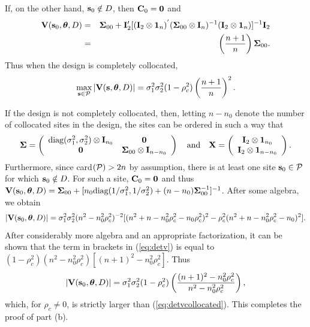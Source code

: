 \documentclass[12pt]{article}
\def\btheta{\mbox{\boldmath$\theta$}}
\def\bSigma{\mbox{\boldmath$\Sigma$}}
\begin{document}
If, on the other hand, ${\bf s}_0\notin D$, then ${\bf C}_0={\bf 0}$ and
\begin{eqnarray*}
{\bf V}({\bf s}_0,\btheta,D) & = & \bSigma_{00}+{\bf I}_2^{\prime}[({\bf I}_2\otimes{\bf 1}_n)^{'}(\bSigma_{00}\otimes{\bf I}_n)^{-1}({\bf I}_2\otimes {\bf 1}_n)]^{-1}{\bf I}_2 \\
& = & \left(\frac{n+1}{n}\right)\bSigma_{00}.
\end{eqnarray*}
Thus when the design is completely collocated,
\begin{equation}\label{eq:detvcollocated}
\max_{{\bf s}\in{\cal P}}|{\bf V}({\bf s},\btheta,D)|=\sigma_1^2\sigma_2^2(1-\rho_c^2)\left(\frac{n+1}{n}\right)^2.
\end{equation}

If the design is not completely collocated, then, letting $n-n_0$ denote the number of collocated sites in the design, the sites can be ordered in such a way that
\[ \bSigma=\left(\begin{array}{cc}
\mbox{diag}(\sigma_1^2,\sigma_2^2)\otimes{\bf I}_{n_0} & {\bf 0} \\
{\bf 0} & \bSigma_{00}\otimes{\bf I}_{n-n_0} \end{array} \right)\quad\mbox{and}\quad
{\bf X}=\left(\begin{array}{c}
{\bf I}_2\otimes{\bf 1}_{n_0} \\
{\bf I}_2\otimes{\bf 1}_{n-n_0} \end{array} \right) .
\]
Furthermore, since card$({\cal P})>2n$ by assumption, there is at least one site ${\bf s}_0\in{\cal P}$ for which ${\bf s}_0\notin D$.  For such a site, ${\bf C}_0={\bf 0}$ and thus
${\bf V}({\bf s}_0,\btheta,D)=\bSigma_{00}+[n_0\mbox{diag}(1/\sigma_1^2,1/\sigma_2^2)+(n-n_0)\bSigma_{00}^{-1}]^{-1}$.
After some algebra, we obtain
\begin{equation}\label{eq:detv}
|{\bf V}({\bf s}_0,\btheta,D)|=\sigma_1^2\sigma_2^2(n^2-n_0^2\rho_c^2)^{-2}[(n^2+n-n_0^2\rho_c^2-n_0\rho_c^2)^2-\rho_c^2(n^2+n-n_0^2\rho_c^2-n_0)^2].
\end{equation}
After considerably more algebra and an appropriate factorization, it can be shown that the term in brackets in (\ref{eq:detv}) is equal to $(1-\rho_c^2)(n^2-n_0^2\rho_c^2)[(n+1)^2-n_0^2\rho_c^2]$.  Thus
\[ |{\bf V}({\bf s}_0,\btheta,D)|=\sigma_1^2\sigma_2^2(1-\rho_c^2)\left(\frac{(n+1)^2-n_0^2\rho_c^2}{n^2-n_0^2\rho_c^2}\right), \]
which, for $\rho_c\neq 0$, is strictly larger than (\ref{eq:detvcollocated}).  This completes the proof of part (b).
\end{document}
